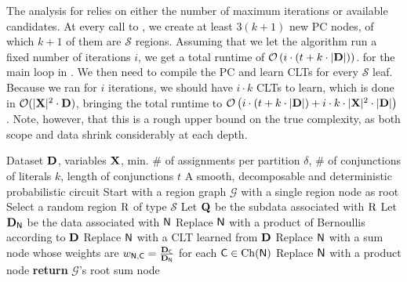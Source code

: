 The analysis for  relies on either the number of maximum iterations or available
candidates. At every call to , we create at least $3(k+1)$ new PC nodes, of
which $k+1$ of them are $\mathcal{S}$ regions. Assuming that we let the algorithm run a fixed number
of iterations $i$, we get a total runtime of $\mathcal{O}\left(i\cdot\left(t+k\cdot|\mathbf{D}|\right)\right)$.
for the main loop in . We then need to compile the PC and learn CLTs for every
$\mathcal{S}$ leaf. Because we ran for $i$ iterations, we should have $i\cdot k$ CLTs to learn,
which is done in $\mathcal{O}(|\mathbf{X}|^2\cdot\mathbf{D})$, bringing the total runtime to
$\mathcal{O}\left(i\cdot\left(t+k\cdot|\mathbf{D}|\right)+i\cdot k\cdot|\mathbf{X}|^2\cdot|\mathbf{D}|\right)$.
Note, however, that this is a rough upper bound on the true complexity, as both scope and data
shrink considerably at each depth.

\begin{algorithm}[t]
  \caption{}\label{alg:xpcs}
  \begin{algorithmic}[1]
    \Require Dataset $\mathbf{D}$, variables $\mathbf{X}$, min. \# of assignments per partition $\delta$,
    \# of conjunctions of literals $k$, length of conjunctions $t$
    \Ensure A smooth, decomposable and deterministic probabilistic circuit
    \State Start with a region graph $\mathcal{G}$ with a single region node as root
      \State Select a random region $\operatorname{\textrm{R}}$ of type $\mathcal{S}$
      \State Let $\mathbf{Q}$ be the subdata associated with $\operatorname{\textrm{R}}$
      \State {}
    \EndWhile
      \State Let $\mathbf{D}_{\operatorname{\textup{\textsf{N}}}}$ be the data associated with $\operatorname{\textup{\textsf{N}}}$
        \State Replace $\operatorname{\textup{\textsf{N}}}$ with a product of Bernoullis according to $\mathbf{D}$
        \State Replace $\operatorname{\textup{\textsf{N}}}$ with a CLT learned from $\mathbf{D}$
        \State Replace $\operatorname{\textup{\textsf{N}}}$ with a sum node whose weights are
          $w_{\operatorname{\textup{\textsf{N}}},\operatorname{\textup{\textsf{C}}}}=\frac{\mathbf{D}_{\operatorname{\textup{\textsf{C}}}}}{\mathbf{D}_{\operatorname{\textup{\textsf{N}}}}}$ for each $\operatorname{\textup{\textsf{C}}}\in\operatorname*{\normalfont{Ch}}(\operatorname{\textup{\textsf{N}}})$
      \Else
        \State Replace $\operatorname{\textup{\textsf{N}}}$ with a product node
      \EndIf
    \EndFor
    \State \textbf{return} $\mathcal{G}$'s root sum node
  \end{algorithmic}
\end{algorithm}

